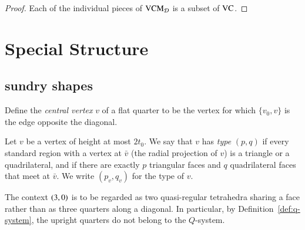 \begin{proof}  Each of the individual pieces of ${\operatorname{VCM}}_{{\mathcal D}}$ is a subset of ${\operatorname{VC}}$.
\end{proof}




\section{Special Structure}



\subsection{sundry shapes}



\begin{definition}
Define the {\it central vertex\/} $v$ of a flat quarter to be the
vertex for which $\{v_0,v\}$ is the edge opposite the diagonal.
\end{definition}


\begin{definition}
Let $v$ be a vertex of height at most $2t_0$.  We say that $v$ has
{\it type\/} $(p,q)$ if every standard region with a vertex at $\bar
v$ (the radial projection of $v$) is a triangle or a quadrilateral,
and if there are exactly $p$ triangular faces and $q$ quadrilateral
faces that meet at $\bar v$.  We write $(p_v,q_v)$ for the type of
$v$.
\end{definition}


The context $\relax(3,0)$ is to be regarded as two
quasi-regular tetrahedra sharing a face rather than as three
quarters along a diagonal.  In particular, by
Definition~\ref{def:q-system}, the upright quarters do not belong
to the $Q$-system.


